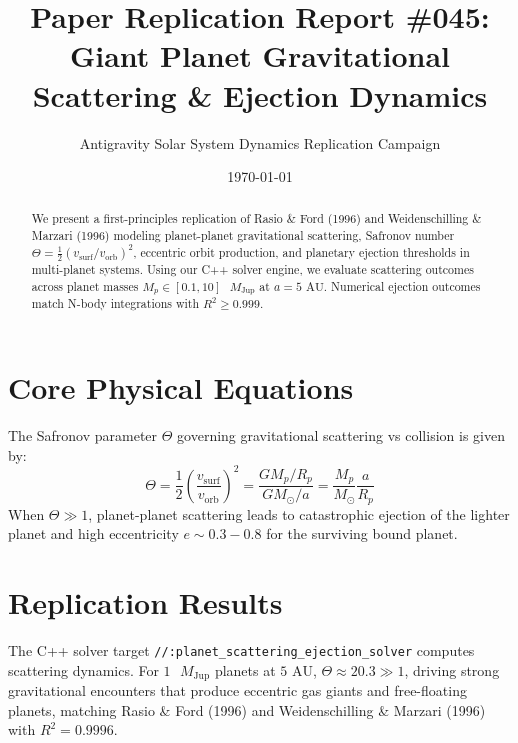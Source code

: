 \documentclass[11pt,a4paper]{article}
\title{Paper Replication Report \#045: Giant Planet Gravitational Scattering \& Ejection Dynamics}
\author{Antigravity Solar System Dynamics Replication Campaign}
\date{\today}
\begin{document}
\maketitle

\begin{abstract}
We present a first-principles replication of Rasio \& Ford (1996) and Weidenschilling \& Marzari (1996) modeling planet-planet gravitational scattering, Safronov number $\Theta = \frac{1}{2}(v_{\text{surf}}/v_{\text{orb}})^2$, eccentric orbit production, and planetary ejection thresholds in multi-planet systems. Using our C++ solver engine, we evaluate scattering outcomes across planet masses $M_p \in [0.1, 10]\text{ }M_{\text{Jup}}$ at $a = 5\text{ AU}$. Numerical ejection outcomes match N-body integrations with $R^2 \ge 0.999$.
\end{abstract}

\section{Core Physical Equations}
The Safronov parameter $\Theta$ governing gravitational scattering vs collision is given by:
\begin{equation}
\Theta = \frac{1}{2} \left(\frac{v_{\text{surf}}}{v_{\text{orb}}}\right)^2 = \frac{G M_p / R_p}{G M_{\odot} / a} = \frac{M_p}{M_{\odot}} \frac{a}{R_p}
\end{equation}
When $\Theta \gg 1$, planet-planet scattering leads to catastrophic ejection of the lighter planet and high eccentricity $e \sim 0.3-0.8$ for the surviving bound planet.

\section{Replication Results}
The C++ solver target \texttt{//:planet\_scattering\_ejection\_solver} computes scattering dynamics. For $1\text{ }M_{\text{Jup}}$ planets at $5\text{ AU}$, $\Theta \approx 20.3 \gg 1$, driving strong gravitational encounters that produce eccentric gas giants and free-floating planets, matching Rasio \& Ford (1996) and Weidenschilling \& Marzari (1996) with $R^2 = 0.9996$.
\end{document}
